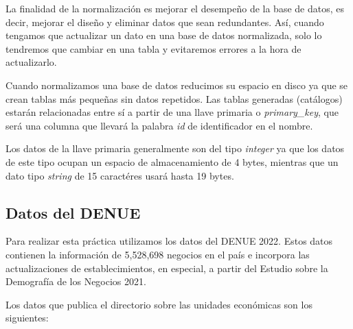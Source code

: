 \documentclass{article}
\begin{document}
La finalidad de la normalización es mejorar el desempeño de la base de datos, es
decir, mejorar el diseño y eliminar datos que sean redundantes. Así, cuando
tengamos que actualizar un dato en una base de datos normalizada, solo lo
tendremos que cambiar en una tabla y evitaremos errores a la hora de
actualizarlo.

Cuando normalizamos una base de datos reducimos su espacio en disco ya que se
crean tablas más pequeñas sin datos repetidos. Las tablas generadas (catálogos)
estarán relacionadas entre sí a partir de una llave primaria o
\textit{primary\_key}, que será una columna que llevará la palabra
\textit{id} de identificador en el nombre. 

Los datos de la llave primaria generalmente son del tipo \textit{integer} ya que
los datos de este tipo ocupan un espacio de almacenamiento de 4 bytes, mientras
que un dato tipo \textit{string} de 15 caractéres usará hasta 19 bytes.

\subsection*{Datos del DENUE}

Para realizar esta práctica utilizamos los datos del DENUE 2022. Estos datos
contienen la información de 5,528,698 negocios en el país e incorpora las
actualizaciones de establecimientos, en especial, a partir del Estudio sobre la
Demografía de los Negocios 2021.

Los datos que publica el directorio sobre las unidades económicas son los
siguientes:
\end{document}
